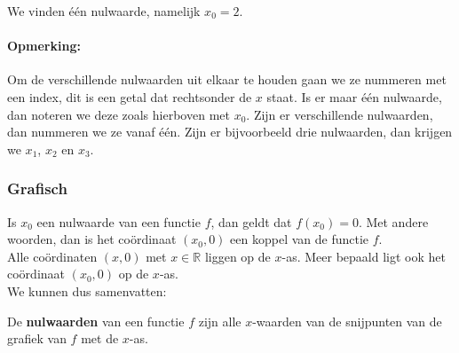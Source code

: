 \documentclass[12pt,twoside]{article}
\begin{document}
\begin{theorie}
We vinden één nulwaarde, namelijk $x_0=2$.

\paragraph*{Opmerking:} Om de verschillende nulwaarden uit elkaar te houden gaan we ze nummeren met een index, dit is een getal dat rechtsonder de $x$ staat. Is er maar één nulwaarde, dan noteren we deze zoals hierboven met $x_0$. Zijn er verschillende nulwaarden, dan nummeren we ze vanaf één. Zijn er bijvoorbeeld drie nulwaarden, dan krijgen we $x_1$, $x_2$ en $x_3$.


\subsubsection*{Grafisch}

\begin{minipage}{0.5\textwidth}
  Is $x_0$ een nulwaarde van een functie $f$, dan geldt dat $f(x_0)=0$. Met andere woorden, dan is het coördinaat $(x_0,0)$ een koppel van de functie $f$.\\

  Alle coördinaten $(x,0)$ met $x\in\mathbb{R}$ liggen op de $x$-as. Meer bepaald ligt ook het coördinaat $(x_0,0)$ op de $x$-as.\\

  We kunnen dus samenvatten:
\end{minipage}
\begin{minipage}{0.5\textwidth}
  \begin{center}
  \end{center}
\end{minipage}

De {\bf nulwaarden} van een functie $f$ zijn alle $x$-waarden van de snijpunten van de grafiek van $f$ met de $x$-as.

\end{theorie}
\end{document}
